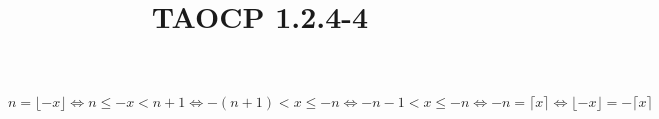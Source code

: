 \documentclass{article}
\title{TAOCP 1.2.4\mbox{-}4}
\begin{document}
\maketitle

\( n = \lfloor -x \rfloor \iff n \leq -x < n + 1 \iff -(n+1) < x \leq -n \iff -n-1 < x \leq -n \iff -n = \lceil x \rceil \iff \lfloor -x \rfloor = - \lceil x \rceil \)
\end{document}
